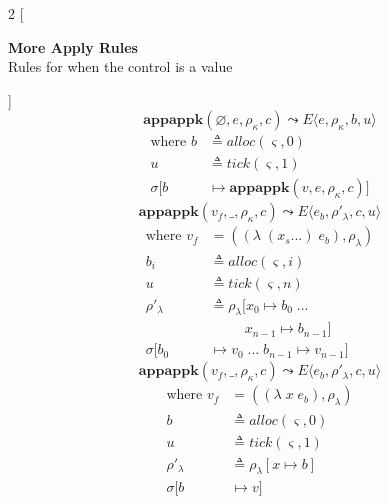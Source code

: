 \documentclass[12pt,draft]{article}
\newcommand{\lamsyn}[2]{(\lambda\;(#1 ...)\;#2)}
\newcommand{\vararglamsyn}[2]{(\lambda\;#1\;#2)}
\begin{document}

\begin{multicols*}{2}
[
\begin{center}
\textbf{More Apply Rules} \\
Rules for when the control is a value
\end{center}
]
\[
\textbf{appappk}(\varnothing, e, \rho_{\kappa}, c)
\leadsto
E\langle
e , \rho_{\kappa} , b , u
\rangle
\]
\vspace{-13mm}
\begin{align*}
\text{where } b &\triangleq alloc(\varsigma, 0) \\
u &\triangleq tick(\varsigma, 1) \\
\sigma[b &\mapsto \textbf{appappk}(v, e, \rho_{\kappa}, c)]
\end{align*}
\[
\textbf{appappk}(v_f,\_, \rho_{\kappa}, c)
\leadsto
E\langle
e_b , \rho'_{\lambda} , c , u
\rangle
\]
\vspace{-11mm}
\begin{align*}
\text{where } v_f &= (\lamsyn{x_s}{e_b}, \rho_{\lambda}) \\
b_i &\triangleq alloc(\varsigma, i) \\
u &\triangleq tick(\varsigma, n) \\
\rho'_{\lambda} &\triangleq \rho_{\lambda}[x_0 \mapsto b_0\; ... \\
&\;\;\;\;\;\;\;\;\;x_{n-1} \mapsto b_{n-1}] \\
\sigma[b_0 &\mapsto v_0\;...\; b_{n-1} \mapsto v_{n-1}]
\end{align*}
\[
\textbf{appappk}(v_f,\_, \rho_{\kappa}, c)
\leadsto
E\langle
e_b , \rho'_{\lambda} , c , u
\rangle
\]
\vspace{-10.5mm}
\begin{align*}
\text{where } v_f &= (\vararglamsyn{x}{e_b}, \rho_{\lambda}) \\
b &\triangleq alloc(\varsigma, 0) \\
u &\triangleq tick(\varsigma, 1) \\
\rho'_{\lambda} &\triangleq \rho_{\lambda}[x \mapsto b] \\
\sigma[b &\mapsto v]
\end{align*}


\end{multicols*}
\end{document}
